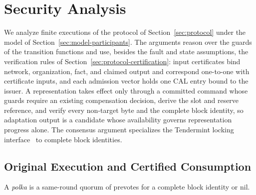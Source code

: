 \section{Security Analysis}
\label{sec:security}

We analyze finite executions of the protocol of Section~\ref{sec:protocol} under the model of Section~\ref{sec:model-participants}. The arguments reason over the guards of the transition functions and use, besides the fault and state assumptions, the verification rules of Section~\ref{sec:protocol-certification}: input certificates bind network, organization, fact, and claimed output and correspond one-to-one with certificate inputs, and each admission vector holds one CAL entry bound to the issuer. A representation takes effect only through a committed command whose guards require an existing compensation decision, derive the slot and reserve reference, and verify every non-target byte and the complete block identity, so adaptation output is a candidate whose availability governs representation progress alone. The consensus argument specializes the Tendermint locking interface~\cite{tendermint} to complete block identities.

\subsection{Original Execution and Certified Consumption}
\label{sec:security-identity}

A \emph{polka} is a same-round quorum of prevotes for a complete block identity or nil.

